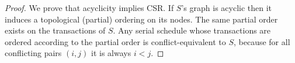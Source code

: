 \begin{proof}
    We prove that acyclicity implies CSR. 
    If $S$'s graph is acyclic then it induces a topological (partial) ordering on its nodes. 
    The same partial order exists on the transactions of $S$. 
    Any serial schedule whose transactions are ordered according to the partial order is conflict-equivalent to $S$, because for all conflicting pairs $(i,j)$ it is always $i<j$. 
\end{proof}